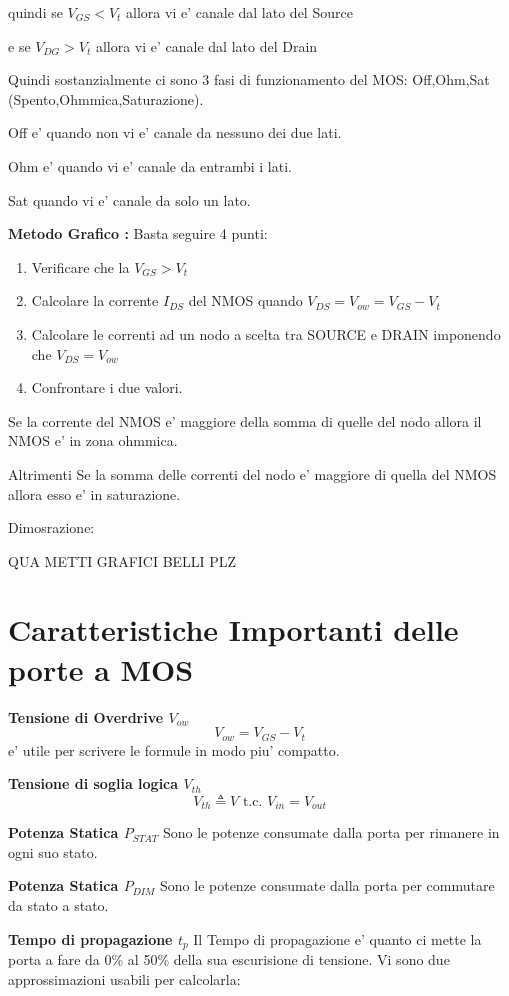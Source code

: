 \documentclass[\main/main.tex]{subfiles}
\begin{document}
quindi se $V_{GS} < V_t$ allora vi e' canale dal lato del Source

e se $V_{DG} > V_t$ allora vi e' canale dal lato del Drain


Quindi sostanzialmente ci sono 3 fasi di funzionamento del MOS: Off,Ohm,Sat (Spento,Ohmmica,Saturazione).

Off e' quando non vi e' canale da nessuno dei due lati.

Ohm e' quando vi e' canale da entrambi i lati.

Sat quando vi e' canale da solo un lato.

\textbf{Metodo Grafico :}
Basta seguire 4 punti:
\begin{enumerate}
\item Verificare che la $V_{GS} > V_t$
\item Calcolare la corrente $I_{DS}$ del NMOS quando $V_{DS} = V_{ow} = V_{GS} - V_{t}$
\item Calcolare le correnti ad un nodo a scelta tra SOURCE e DRAIN imponendo che $V_{DS} = V_{ow}$
\item Confrontare i due valori.
\end{enumerate}
Se la corrente del NMOS e' maggiore della somma di quelle del nodo allora il NMOS e' in zona ohmmica.

Altrimenti Se la somma delle correnti del nodo e' maggiore di quella del NMOS allora esso e' in saturazione.

Dimosrazione:

QUA METTI GRAFICI BELLI PLZ

\clearpage
\section{Caratteristiche Importanti delle porte a MOS}
\textbf{Tensione di Overdrive $V_{ow}$}
\[ V_{ow} = V_{GS} - V_t\]
e' utile per scrivere le formule in modo piu' compatto.

\textbf{Tensione di soglia logica $V_{th}$}
\[V_{th} \triangleq V \text{ t.c. } V_{in} = V_{out}\]

\textbf{Potenza Statica $P_{STAT}$}
Sono le potenze consumate dalla porta per rimanere in ogni suo stato.

\textbf{Potenza Statica $P_{DIM}$}
Sono le potenze consumate dalla porta per commutare da stato a stato.

\textbf{Tempo di propagazione $t_p$}
Il Tempo di propagazione e' quanto ci mette la porta a fare da 0\% al 50\% della sua escurisione di tensione.
Vi sono due approssimazioni usabili per calcolarla:
\end{document}
